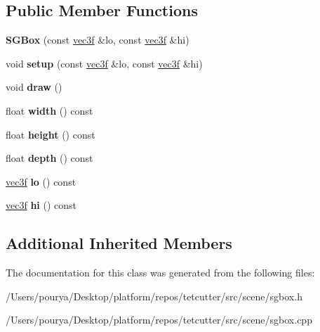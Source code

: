 \subsection*{Public Member Functions}
\begin{DoxyCompactItemize}
\item 
\hypertarget{classps_1_1scene_1_1SGBox_afe50d22303e1a22efa4b438d85f76a30}{}{\bfseries S\+G\+Box} (const \hyperlink{classps_1_1base_1_1Vec3}{vec3f} \&lo, const \hyperlink{classps_1_1base_1_1Vec3}{vec3f} \&hi)\label{classps_1_1scene_1_1SGBox_afe50d22303e1a22efa4b438d85f76a30}

\item 
\hypertarget{classps_1_1scene_1_1SGBox_ae1093216bb21d691f689a9d463d8eaeb}{}void {\bfseries setup} (const \hyperlink{classps_1_1base_1_1Vec3}{vec3f} \&lo, const \hyperlink{classps_1_1base_1_1Vec3}{vec3f} \&hi)\label{classps_1_1scene_1_1SGBox_ae1093216bb21d691f689a9d463d8eaeb}

\item 
\hypertarget{classps_1_1scene_1_1SGBox_abd52c00d14ffa2f7ea6c679bf7df5583}{}void {\bfseries draw} ()\label{classps_1_1scene_1_1SGBox_abd52c00d14ffa2f7ea6c679bf7df5583}

\item 
\hypertarget{classps_1_1scene_1_1SGBox_a07a605e581e5740f5222461de12c3037}{}float {\bfseries width} () const \label{classps_1_1scene_1_1SGBox_a07a605e581e5740f5222461de12c3037}

\item 
\hypertarget{classps_1_1scene_1_1SGBox_af659d949ab269cf52ec68381b6402c25}{}float {\bfseries height} () const \label{classps_1_1scene_1_1SGBox_af659d949ab269cf52ec68381b6402c25}

\item 
\hypertarget{classps_1_1scene_1_1SGBox_acd985a0b9d6a403db97aaede05dcec90}{}float {\bfseries depth} () const \label{classps_1_1scene_1_1SGBox_acd985a0b9d6a403db97aaede05dcec90}

\item 
\hypertarget{classps_1_1scene_1_1SGBox_a77f528a487afba2e31491e4433e96301}{}\hyperlink{classps_1_1base_1_1Vec3}{vec3f} {\bfseries lo} () const \label{classps_1_1scene_1_1SGBox_a77f528a487afba2e31491e4433e96301}

\item 
\hypertarget{classps_1_1scene_1_1SGBox_a5a11a8afaa64e233cefbd9c12eb922ef}{}\hyperlink{classps_1_1base_1_1Vec3}{vec3f} {\bfseries hi} () const \label{classps_1_1scene_1_1SGBox_a5a11a8afaa64e233cefbd9c12eb922ef}

\end{DoxyCompactItemize}
\subsection*{Additional Inherited Members}


The documentation for this class was generated from the following files\+:\begin{DoxyCompactItemize}
\item 
/\+Users/pourya/\+Desktop/platform/repos/tetcutter/src/scene/sgbox.\+h\item 
/\+Users/pourya/\+Desktop/platform/repos/tetcutter/src/scene/sgbox.\+cpp\end{DoxyCompactItemize}
